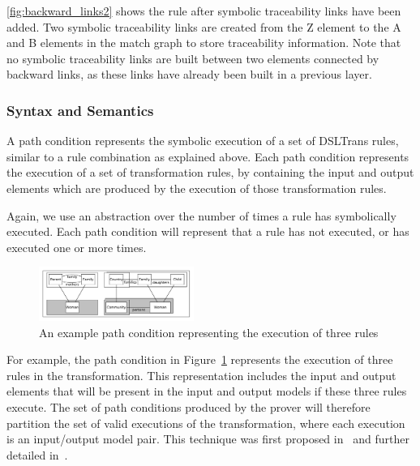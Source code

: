 \cref{fig:backward_links2} shows the rule after symbolic traceability links have been added. Two symbolic traceability links are created from the Z element to the A and B elements in the match graph to store traceability information. Note that no symbolic traceability links are built between two elements connected by backward links, as these links have already been built in a previous layer.



\subsubsection{Syntax and Semantics}
\label{subsubsec:path_condition_creation}

A path condition represents the symbolic execution of a set of DSLTrans rules, similar to a rule combination as explained above. Each path condition represents the execution of a set of transformation rules, by containing the input and output elements which are produced by the execution of those transformation rules.

Again, we use an abstraction over the number of times a rule has symbolically executed. Each path condition will represent that a rule has not executed, or has executed one or more times.

   \begin{figure}[t]
     \begin{center}
       \includegraphics[width=0.45\textwidth]{figures/path_conditions/pc.pdf}
       \caption{An example path condition representing the execution of three rules}
       \label{fig:pc_first}
     \end{center}
     \vspace{-0.20in}
   \end{figure}
   
For example, the path condition in Figure~\ref{fig:pc_first} represents the execution of three rules in the transformation. This representation includes the input and output elements that will be present in the input and output models if these three rules execute. The set of path conditions produced by the prover will therefore partition the set of valid executions of the transformation, where each execution is an input/output model pair. This technique was first proposed in~\cite{Lucio2010} and further detailed in~\cite{Lucio2014}.


